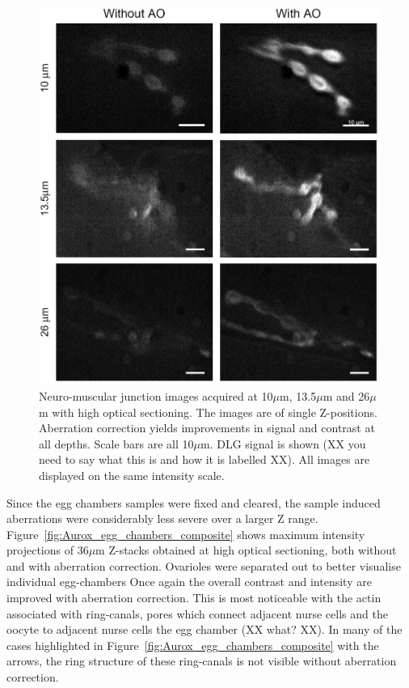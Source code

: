 \begin{figure}[h]
	\centering
	\includegraphics[width=\textwidth]{images/Aurox_depth_comparison_composite.jpg}
	\caption[Depth comparison of the Aurox imaging system]{Neuro-muscular 
		junction images acquired at 10$\mu$m, 13.5$\mu$m and 26$\mu$m with 
		high optical sectioning. The images are of single Z-positions. 
		Aberration correction yields improvements in signal and contrast 
		at all depths. Scale bars are all 10$\mu$m. DLG signal
                is shown (XX you need to say what this is and how it is
                labelled XX). 
		All images are displayed on the same intensity scale.}
	\label{fig:Aurox_depth_comparison_composite}
\end{figure}

Since the egg chambers samples were fixed and cleared, the sample induced 
aberrations were considerably less severe over a larger Z range. 
Figure~\ref{fig:Aurox_egg_chambers_composite} shows maximum intensity 
projections of 36$\mu$m Z-stacks obtained at high optical sectioning, both
without and with aberration correction. Ovarioles were separated out to 
better visualise individual egg-chambers Once again the overall contrast 
and intensity are improved with aberration correction. This is most 
noticeable with the actin associated with ring-canals, pores which connect 
adjacent nurse cells and the oocyte to adjacent nurse cells the egg
chamber (XX what? XX).
In many of the cases highlighted in Figure~\ref{fig:Aurox_egg_chambers_composite}
with the arrows, the ring structure of these ring-canals is not visible
without aberration correction.

